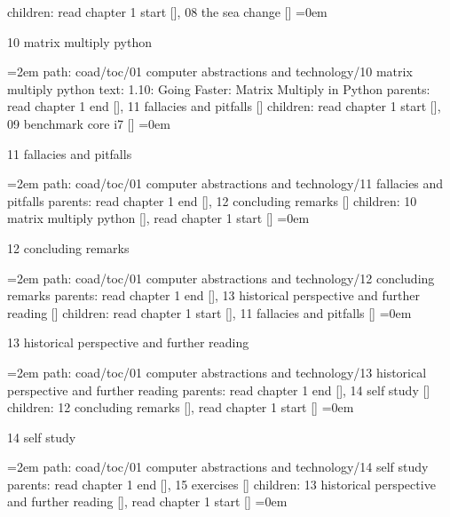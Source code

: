 \smallskip
children: read chapter 1 start [], 08 the sea change []
\smallskip
\leftskip=0em
\par\endgroup
\bigskip
{}
10 matrix multiply python
\smallskip
\par\begingroup
\leftskip=2em
path: coad/toc/01 computer abstractions and technology/10 matrix multiply python
\smallskip
text:  1.10: Going Faster: Matrix Multiply in Python
\smallskip
parents:  read chapter 1 end [], 11 fallacies and pitfalls []
\smallskip
children: read chapter 1 start [], 09 benchmark core i7 []
\smallskip
\leftskip=0em
\par\endgroup
\bigskip
{}
11 fallacies and pitfalls
\smallskip
\par\begingroup
\leftskip=2em
path: coad/toc/01 computer abstractions and technology/11 fallacies and pitfalls
\smallskip
parents:  read chapter 1 end [], 12 concluding remarks []
\smallskip
children: 10 matrix multiply python [], read chapter 1 start []
\smallskip
\leftskip=0em
\par\endgroup
\bigskip
{}
12 concluding remarks
\smallskip
\par\begingroup
\leftskip=2em
path: coad/toc/01 computer abstractions and technology/12 concluding remarks
\smallskip
parents:  read chapter 1 end [], 13 historical perspective and further reading []
\smallskip
children: read chapter 1 start [], 11 fallacies and pitfalls []
\smallskip
\leftskip=0em
\par\endgroup
\bigskip
{}
13 historical perspective and further reading
\smallskip
\par\begingroup
\leftskip=2em
path: coad/toc/01 computer abstractions and technology/13 historical perspective and further reading
\smallskip
parents:  read chapter 1 end [], 14 self study []
\smallskip
children: 12 concluding remarks [], read chapter 1 start []
\smallskip
\leftskip=0em
\par\endgroup
\bigskip
{}
14 self study
\smallskip
\par\begingroup
\leftskip=2em
path: coad/toc/01 computer abstractions and technology/14 self study
\smallskip
parents:  read chapter 1 end [], 15 exercises []
\smallskip
children: 13 historical perspective and further reading [], read chapter 1 start []
\smallskip
\leftskip=0em
\par\endgroup
